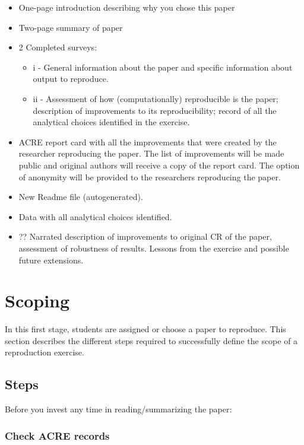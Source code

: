 \documentclass[]{book}
\providecommand{\tightlist}{%
  \setlength{\itemsep}{0pt}\setlength{\parskip}{0pt}}
\begin{document}
\begin{itemize}
\item
  One-page introduction describing why you chose this paper
\item
  Two-page summary of paper
\item
  2 Completed surveys:

  \begin{itemize}
  \tightlist
  \item
    i - General information about the paper and specific
    information about output to reproduce.\\
  \item
    ii - Assessment of how (computationally) reproducible is the paper; description of improvements to its reproducibility; record of all the analytical choices identified in the exercise.
  \end{itemize}
\item
  ACRE report card with all the improvements that were created by the researcher reproducing the paper. The list of improvements will be made public and original authors will receive a copy of the report card. The option of anonymity will be provided to the researchers reproducing the paper.
\item
  New Readme file (autogenerated).
\item
  Data with all analytical choices identified.
\item
  ?? Narrated description of improvements to original CR of the paper, assessment of robustness of results. Lessons from the exercise and possible future extensions.
\end{itemize}

\hypertarget{scoping}{%
\chapter{Scoping}\label{scoping}}

In this first stage, students are assigned or choose a paper to reproduce. This section describes the different steps required to successfully define the scope of a reproduction exercise.

\hypertarget{steps}{%
\section{Steps}\label{steps}}

Before you invest any time in reading/summarizing the paper:

\hypertarget{check-acre-records}{%
\subsection{Check ACRE records}\label{check-acre-records}}
\end{document}
